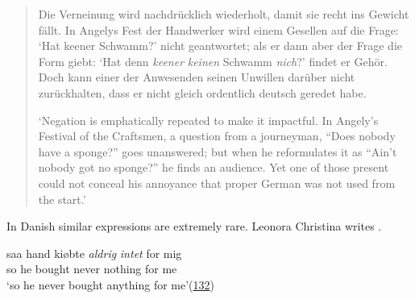 \begin{quote}
  
Die Verneinung wird nachdrücklich wiederholt, damit sie recht ins Gewicht fällt. In Angelys Fest der Handwerker wird einem Gesellen auf die Frage: ‘Hat keener Schwamm?’ nicht geantwortet; als er dann aber der Frage die Form giebt: ‘Hat denn \emph{keener} \emph{keinen} Schwamm \emph{nich}?’ findet er Gehör. Doch kann einer der Anwesenden seinen Unwillen darüber nicht zurückhalten, dass er nicht gleich ordentlich deutsch geredet habe.
 
 `Negation is emphatically repeated to make it impactful. In Angely's Festival of the Craftsmen, a question from a journeyman, ``Does nobody have a sponge?'' goes unanswered; but when he reformulates it as ``Ain't nobody got no sponge?'' he finds an audience. Yet one of those present could not conceal his annoyance that proper German was not used from the start.'
\end{quote} %

In Danish similar expressions are extremely rare. Leonora Christina %
writes .

\ea \label{ex:07-25}
\gll saa hand kiøbte \emph{aldrig} \emph{intet} for mig\\
 so he bought never nothing for me\\
\glt `so he never bought anything for me'\hfill(\href{https://www.gutenberg.org/cache/epub/41072/pg41072-images.html#Side_151}{132})
\z

